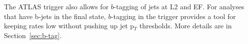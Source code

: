 The ATLAS trigger also allows for $b$-tagging of jets at L2 and EF.  For analyses that have 
b-jets in the final state, $b$-tagging in the trigger provides a tool for keeping rates 
low without pushing up jet p$_T$ thresholds.  More details are in Section~\ref{sec:b-tag}.








